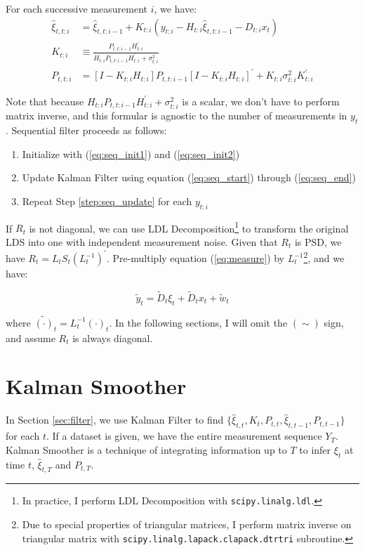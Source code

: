 \documentclass[12pt]{article}
\newenvironment{boenumerate}
    {\begin{enumerate}\renewcommand\labelenumi{\textbf\theenumi}}
    {\end{enumerate}}
\numberwithin{equation}{section}
\begin{document}
For each successive measurement $i$, we have:
\begin{align}
    \hat{\xi}_{t,t:i} &= \hat{\xi}_{t,t:i-1} + K_{t:i}(y_{t:i} - H_{t:i}\hat{\xi}_{t,t:i-1} - D_{t:i}x_{t}) \label{eq:seq_start} \\ 
    K_{t:i} &\equiv \frac{P_{t,t:i-1}H_{t:i}^{'}}{H_{t:i}P_{t,t:i-1}H_{t:i}^{'}+\sigma_{t:i}^{2}} \\
    P_{t,t:i} &= [I - K_{t:i}H_{t:i}]P_{t,t:i-1}[I-K_{t:i}H_{t:i}]^{'} + K_{t:i}\sigma_{t:i}^{2}K_{t:i}^{'} \label{eq:seq_end}
\end{align}

Note that because $H_{t:i}P_{t,t:i-1}H_{t:i}^{'}+\sigma_{t:i}^{2}$ is a scalar, we don't have to perform matrix inverse, and this formular is agnostic to the number of measurements in $y_t$. Sequential filter proceeds as follows:
\begin{boenumerate}
    \item Initialize with (\ref{eq:seq_init1}) and (\ref{eq:seq_init2})
    \item \label{step:seq_update} Update Kalman Filter using equation (\ref{eq:seq_start}) through (\ref{eq:seq_end})
    \item Repeat Step \ref{step:seq_update} for each $y_{t:i}$
\end{boenumerate}

If $R_t$ is not diagonal, we can use LDL Decomposition\footnote{In practice, I perform LDL Decomposition with \texttt{scipy.linalg.ldl}.} to transform the original LDS into one with independent measurement noise. Given that $R_t$ is PSD, we have $R_t = L_tS_t(L_t^{-1})^{'}$. Pre-multiply equation (\ref{eq:measure}) by $L_t^{-1}$\footnote{Due to special properties of triangular matrices, I perform matrix inverse on triangular matrix with \texttt{scipy.linalg.lapack.clapack.dtrtri} subroutine.}, and we have:

\[
    \tilde{y}_t = \tilde{D}_t\xi_{t} + \tilde{D}_{t}x_t + \tilde{w}_t
\]

where $\tilde{(\cdot)}_t = L_t^{-1}(\cdot)_t$. In the following sections, I will omit the $(\sim)$ sign, and assume $R_t$ is always diagonal. 

\section{Kalman Smoother} \label{sec:smoother}
In Section \ref{sec:filter}, we use Kalman Filter to find $\{\hat{\xi}_{t,t}, K_t, P_{t,t}, \hat{\xi}_{t,t-1}, P_{t,t-1}\}$ for each $t$. If a dataset is given, we have the entire measurement sequence $Y_T$. Kalman Smoother is a technique of integrating information up to $T$ to infer $\xi_t$ at time $t$, $\hat{\xi}_{t,T}$ and $P_{t,T}$. 
\end{document}
